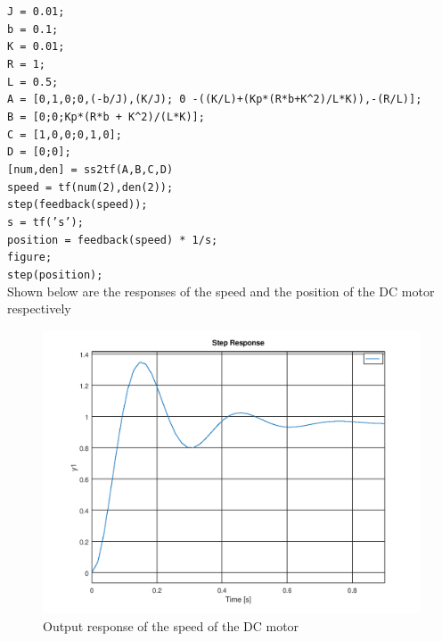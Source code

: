 \documentclass[a4paper, 12pt]{article}
\begin{document}
\noindent
\texttt{J = 0.01;}\\
\texttt{b = 0.1;}\\
\texttt{K = 0.01;}\\
\texttt{R = 1;}\\
\texttt{L = 0.5;}\\
\texttt{A = [0,1,0;0,(-b/J),(K/J); 0 -((K/L)+(Kp*(R*b+K\^{}2)/L*K)),-(R/L)];}\\
\texttt{B = [0;0;Kp*(R*b + K\^{}2)/(L*K)];}\\
\texttt{C = [1,0,0;0,1,0];}\\
\texttt{D = [0;0];}\\
\texttt{[num,den] = ss2tf(A,B,C,D)}\\
\texttt{speed = tf(num(2),den(2));}\\
\texttt{step(feedback(speed));}\\
\texttt{s = tf('s');}\\
\texttt{position = feedback(speed) * 1/s;}\\
\texttt{figure;}\\
\texttt{step(position);}\\

Shown below are the responses of the speed and the position of the DC motor respectively

\begin{figure}[H]
	\centering
	\includegraphics[width=\textwidth]{Images/question_3_speed.png}
	\caption{Output response of the speed of the DC motor}
	\label{fig:question_3_speed}
\end{figure}
\end{document}
